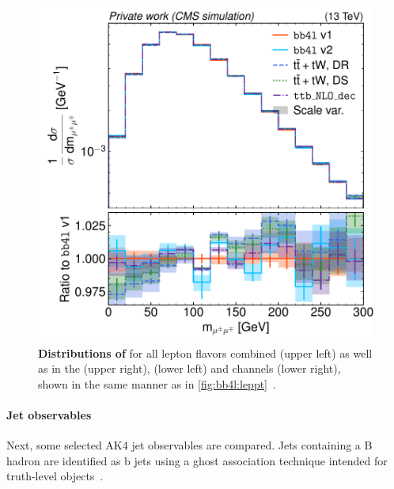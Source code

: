 \begin{figure}[tp]
    \hfill
    \includegraphics[width=0.49 \textwidth]{figures/bb4l/generators/MC_TTBAR_DILEP_SPINDENSITY_mll_mumu.pdf}
    \caption{\textbf{Distributions of \mll} for all lepton flavors combined (upper left) as well as in the \emu (upper right), \ee (lower left) and \mumu channels (lower right), shown in the same manner as in \cref{fig:bb4l:leppt}~\cite{CMS:NOTE-2023-015}.}
    \label{fig:bb4l:mll}
\end{figure}

\paragraph{Jet observables} Next, some selected AK4 jet observables are compared. 
Jets containing a B hadron are identified as b jets using a ghost association technique intended for truth-level objects~\cite{Cacciari:2007fd,Cacciari:2008gn}. 

